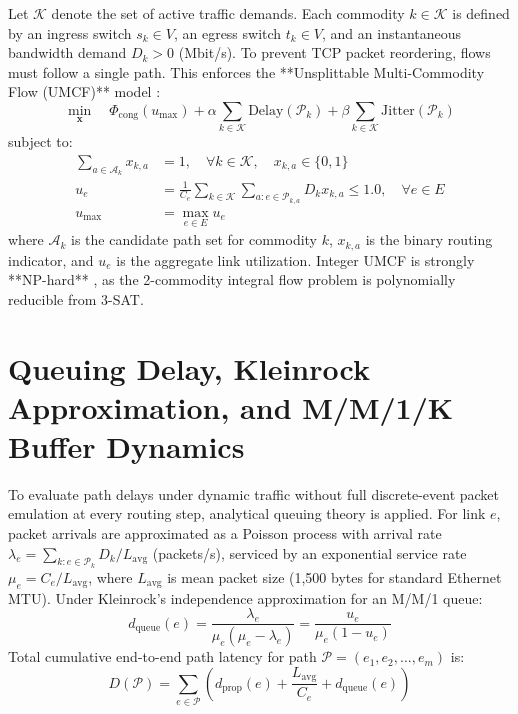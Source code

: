 \documentclass[12pt,a4paper,oneside]{report}
\begin{document}
Let $\mathcal{K}$ denote the set of active traffic demands. Each commodity $k \in \mathcal{K}$ is defined by an ingress switch $s_k \in V$, an egress switch $t_k \in V$, and an instantaneous bandwidth demand $D_k > 0$ (Mbit/s). To prevent TCP packet reordering, flows must follow a single path. This enforces the **Unsplittable Multi-Commodity Flow (UMCF)** model \cite{even1975complexity}:
\begin{equation}
\min_{\mathbf{x}} \quad \Phi_{\mathrm{cong}}(u_{\max}) + \alpha \sum_{k \in \mathcal{K}} \mathrm{Delay}(\mathcal{P}_k) + \beta \sum_{k \in \mathcal{K}} \mathrm{Jitter}(\mathcal{P}_k)
\end{equation}
subject to:
\begin{align}
\sum_{a \in \mathcal{A}_k} x_{k, a} &= 1, \quad \forall k \in \mathcal{K}, \quad x_{k, a} \in \{0, 1\} \label{eq:umcf_binary}\\
u_e &= \frac{1}{C_e} \sum_{k \in \mathcal{K}} \sum_{a: e \in \mathcal{P}_{k, a}} D_k x_{k, a} \le 1.0, \quad \forall e \in E \label{eq:umcf_capacity}\\
u_{\max} &= \max_{e \in E} u_e
\end{align}
where $\mathcal{A}_k$ is the candidate path set for commodity $k$, $x_{k, a}$ is the binary routing indicator, and $u_e$ is the aggregate link utilization. Integer UMCF is strongly **NP-hard** \cite{even1975complexity}, as the 2-commodity integral flow problem is polynomially reducible from 3-SAT.

\section{Queuing Delay, Kleinrock Approximation, and M/M/1/K Buffer Dynamics}
To evaluate path delays under dynamic traffic without full discrete-event packet emulation at every routing step, analytical queuing theory is applied.
For link $e$, packet arrivals are approximated as a Poisson process with arrival rate $\lambda_e = \sum_{k: e \in \mathcal{P}_k} D_k / L_{\mathrm{avg}}$ (packets/s), serviced by an exponential service rate $\mu_e = C_e / L_{\mathrm{avg}}$, where $L_{\mathrm{avg}}$ is mean packet size (1,500 bytes for standard Ethernet MTU). Under Kleinrock's independence approximation for an M/M/1 queue:
\begin{equation}
d_{\mathrm{queue}}(e) = \frac{\lambda_e}{\mu_e (\mu_e - \lambda_e)} = \frac{u_e}{\mu_e (1 - u_e)}
\end{equation}
Total cumulative end-to-end path latency for path $\mathcal{P} = (e_1, e_2, \dots, e_m)$ is:
\begin{equation}
D(\mathcal{P}) = \sum_{e \in \mathcal{P}} \left( d_{\mathrm{prop}}(e) + \frac{L_{\mathrm{avg}}}{C_e} + d_{\mathrm{queue}}(e) \right)
\end{equation}
\end{document}
